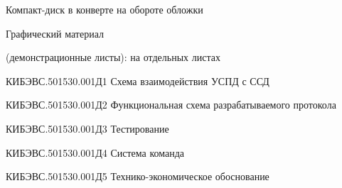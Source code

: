 


 
 
 
 
 \newpage
 \tableofcontents
 
 \noindent\hspace{7.5mm}Компакт-диск \hfill в конверте на обороте обложки
 
 \noindent\hspace{7.5mm}Графический материал
 
 \noindent\hspace{7.5mm}(демонстрационные листы): \hfill на отдельных листах
 
 \noindent\hspace{7.5mm}КИБЭВС.501530.001Д1 Схема взаимодействия УСПД с ССД
 
 \noindent\hspace{7.5mm}КИБЭВС.501530.001Д2 Функциональная схема разрабатываемого протокола

 \noindent\hspace{7.5mm}КИБЭВС.501530.001Д3 Тестирование
 
 \noindent\hspace{7.5mm}КИБЭВС.501530.001Д4 Система команда 
 
 \noindent\hspace{7.5mm}КИБЭВС.501530.001Д5 Технико-экономическое обоснование
 
 
 
 
 
 
 
 \newpage
 \renewcommand{\refname}{\hfill Список использованных источников \hfill}
 
 
 
 


